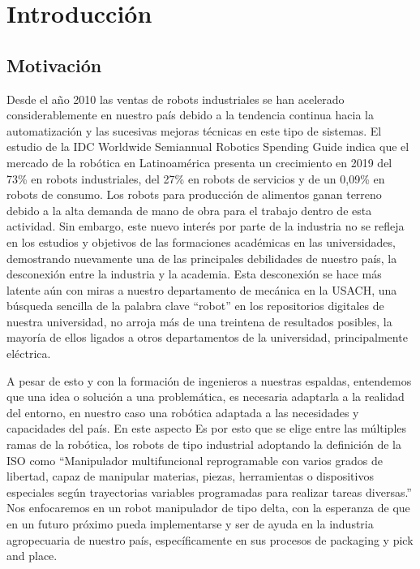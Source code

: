 \chapter{Introducción}\label{CAP1}

\section{Motivación}

Desde el año 2010 las ventas de robots industriales se han acelerado considerablemente en nuestro país debido a la tendencia continua hacia la automatización y las sucesivas mejoras técnicas en este tipo de sistemas. El estudio de la IDC Worldwide Semiannual Robotics Spending Guide indica que el mercado de la robótica en Latinoamérica presenta un crecimiento en 2019 del 73\% en robots industriales, del 27\% en robots de servicios y de un 0,09\% en robots de consumo. Los robots para producción de alimentos ganan terreno debido a la alta demanda de mano de obra para el trabajo dentro de esta actividad. Sin embargo, este nuevo interés por parte de la industria no se refleja en los estudios y objetivos de las formaciones académicas en las universidades, demostrando nuevamente una de las principales debilidades de nuestro país, la desconexión entre la industria y la academia. Esta desconexión se hace más latente aún con miras a nuestro departamento de mecánica en la USACH, una búsqueda sencilla de la palabra clave “robot” en los repositorios digitales de nuestra universidad, no arroja más de una treintena de resultados posibles, la mayoría de ellos ligados a otros departamentos de la universidad, principalmente eléctrica.

A pesar de esto y con la formación de ingenieros a nuestras espaldas, entendemos que una idea o solución a una problemática, es necesaria adaptarla a la realidad del entorno, en nuestro caso una robótica adaptada a las necesidades y capacidades del país. En este aspecto   Es por esto que se elige entre las múltiples ramas de la robótica, los robots de tipo industrial adoptando la definición de la ISO como “Manipulador multifuncional reprogramable con varios grados de libertad, capaz de manipular materias, piezas, herramientas o dispositivos especiales según trayectorias variables programadas para realizar tareas diversas.” Nos enfocaremos en un robot manipulador de tipo delta, con la esperanza de que en un futuro próximo pueda implementarse y ser de ayuda en la industria agropecuaria de nuestro país, específicamente en sus procesos de packaging y pick and place.

